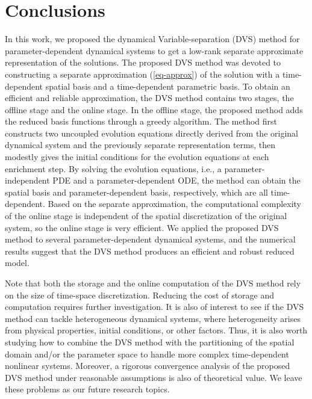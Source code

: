 \documentclass[10pt,a4paper]{article}
\numberwithin{equation}{section}
\numberwithin{lemma}{section}
\numberwithin{example}{section}
\numberwithin{definition}{section}
\numberwithin{assumption}{section}
\numberwithin{theorem}{section}
\numberwithin{proposition}{section}
\numberwithin{corollary}{section}
\numberwithin{remark}{section}
\begin{document}
\section{Conclusions}
\label{sec-Conclusions}
In this work, we proposed the dynamical Variable-separation (DVS) method for parameter-dependent dynamical systems to get a low-rank separate approximate representation of the solutions.
The proposed DVS method was devoted to constructing a separate approximation (\ref{eq-approx}) of the solution with a time-dependent spatial basis and a time-dependent parametric basis.
To obtain an efficient and reliable approximation, the DVS method contains two stages, the offline stage and the online stage.
In the offline stage, the proposed method adds the reduced basis functions through a greedy algorithm.
The method first constructs two uncoupled evolution equations directly derived from the original dynamical system and the previously separate representation terms, then modestly gives the initial conditions for the evolution equations at each enrichment step.
By solving the evolution equations, i.e., a parameter-independent PDE and a parameter-dependent ODE, the method can obtain the spatial basis and parameter-dependent basis,  respectively, which are all time-dependent.
Based on the separate approximation, the computational complexity of the online stage is independent of the spatial discretization of the original system, so the online stage is very efficient.
We applied the proposed DVS method to several parameter-dependent dynamical systems, and the numerical results suggest that the DVS method produces an efficient and robust reduced model.



Note that both the storage and the online computation of the DVS method rely on the size of time-space discretization. 
Reducing the cost of storage and computation requires further investigation. 
It is also of interest to see if the DVS method can tackle heterogeneous dynamical systems, where heterogeneity arises from physical properties, initial conditions, or other factors. 
Thus, it is also worth studying how to combine the DVS method with the partitioning of the spatial domain and/or the parameter space to handle more complex time-dependent nonlinear systems. 
Moreover, a rigorous convergence analysis of the proposed DVS method under reasonable assumptions is also of theoretical value. We leave these problems as our future research topics. 


\appendix
\end{document}
